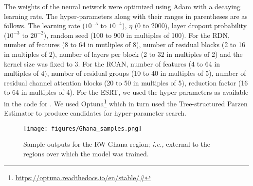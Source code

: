 

The weights of the neural network were optimized using Adam \cite{Kingma2015} with a decaying learning rate. The hyper-parameters along with their ranges in parentheses are as follows. The learning rate ($10^{-5}$ to $10^{-4}$), $\eta$ (0 to 2000), layer dropout probability ($10^{-3}$ to $20^{-2}$), random seed (100 to 900 in multiples of 100). For the \ac{RDN}, number of features (8 to 64 in mutliples of 8), number of residual blocks (2 to 16 in multiples of 2), number of layers per block (2 to 32 in multiples of 2) and the kernel size was fixed to 3. For the \ac{RCAN}, number of features (4 to 64 in multiples of 4), number of residual groups (10 to 40 in multiples of 5), number of residual channel attention blocks (20 to 50 in multiples of 5), reduction factor (16 to 64 in multiples of 4). For the \ac{ESRT}, we used the hyper-parameters as available in the code for \cite{LuESRT2022}. We used Optuna\footnote{\href{https://optuna.readthedocs.io/en/stable/\#}{https://optuna.readthedocs.io/en/stable/\#}} which in turn used the Tree-structured Parzen Estimator \cite{Bergstra2011HPOptimizationAlgorithms} to produce candidates for hyper-parameter search.


\begin{figure*}[htpb!]
  \centering
  \captionsetup{justification=centering}
  \texttt{[image: figures/Ghana\_samples.png]}
  \caption{\label{fig:GhanaSamples} Sample outputs for the \ac{RW} Ghana region; \textit{i.e.,} external to the regions over which the model was trained.}
\end{figure*}






